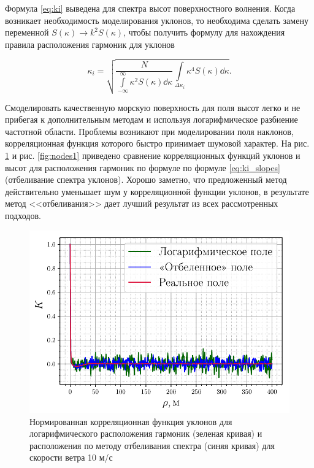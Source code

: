 Формула \eqref{eq:ki} выведена для спектра высот поверхностного волнения. Когда
возникает необходимость моделирования уклонов, то необходима сделать замену
переменной $S(\kappa) \to k^2 S(\kappa)$, чтобы получить формулу для нахождения правила
расположения гармоник для уклонов


\begin{equation}
    \label{eq:ki_slopes}
    {
        \kappa_i = \sqrt{\frac{N}{\int\limits_{-\infty}^{\infty} \kappa^2
        S(\kappa) \dd \kappa } \int\limits_{\Delta \kappa_i}
    \kappa^4 S(\kappa) \dd \kappa}. 
    }
\end{equation}

Смоделировать качественную морскую поверхность для поля высот легко и не
прибегая к дополнительным методам и используя логарифмическое разбиение
частотной области. Проблемы возникают при моделировании поля наклонов,
корреляционная функция которого быстро принимает шумовой характер.  
На рис. \ref{fig:nodes} и рис. \ref{fig:nodes1} приведено сравнение
корреляционных функций уклонов и высот для расположения гармоник по формуле по
формуле \eqref{eq:ki_slopes} (отбеливание спектра уклонов). Хорошо заметно, что
предложенный метод действительно уменьшает шум у корреляционной функции
уклонов, в результате метод <<отбеливания>> дает лучший результат из всех рассмотренных подходов. 

\begin{figure}[h!]
    \centering
    \includegraphics[width=0.6\linewidth]{fig/correlation_angles_wa.pdf}
    \caption{ Нормированная корреляционная функция уклонов для логарифмического расположения
    гармоник (зеленая кривая) и расположения по методу отбеливания спектра
(синяя кривая) для скорости ветра 10 м/с}
    \label{fig:nodes}
\end{figure}

